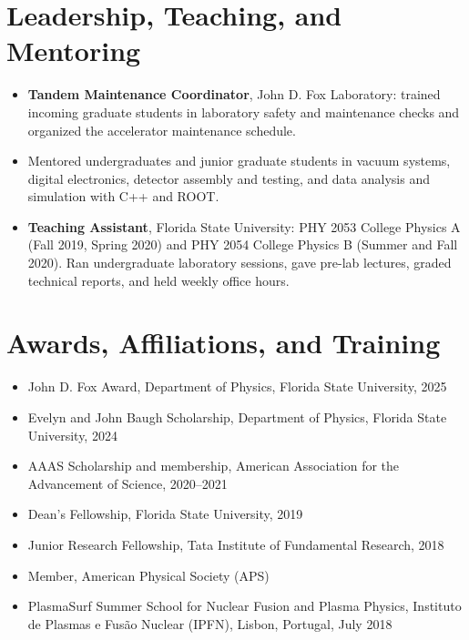 \documentclass[10pt,letterpaper]{article}
\begin{document}
\section{Leadership, Teaching, and Mentoring}
\begin{itemize}
  \item \textbf{Tandem Maintenance Coordinator}, John D. Fox Laboratory: trained incoming graduate students in laboratory safety and maintenance checks and organized the accelerator maintenance schedule.
  \item Mentored undergraduates and junior graduate students in vacuum systems, digital electronics, detector assembly and testing, and data analysis and simulation with C++ and ROOT.
  \item \textbf{Teaching Assistant}, Florida State University: PHY 2053 College Physics A (Fall 2019, Spring 2020) and PHY 2054 College Physics B (Summer and Fall 2020). Ran undergraduate laboratory sessions, gave pre-lab lectures, graded technical reports, and held weekly office hours.
\end{itemize}

\section{Awards, Affiliations, and Training}
\begin{itemize}
  \item John D. Fox Award, Department of Physics, Florida State University, 2025
  \item Evelyn and John Baugh Scholarship, Department of Physics, Florida State University, 2024
  \item AAAS Scholarship and membership, American Association for the Advancement of Science, 2020--2021
  \item Dean's Fellowship, Florida State University, 2019
  \item Junior Research Fellowship, Tata Institute of Fundamental Research, 2018
  \item Member, American Physical Society (APS)
  \item PlasmaSurf Summer School for Nuclear Fusion and Plasma Physics, Instituto de Plasmas e Fusão Nuclear (IPFN), Lisbon, Portugal, July 2018
\end{itemize}
\end{document}

